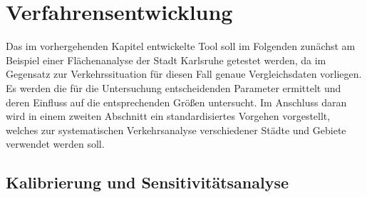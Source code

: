 \section{Verfahrensentwicklung}
\label{sec:verfahrensentwicklung}

Das im vorhergehenden Kapitel entwickelte Tool soll im Folgenden zunächst am Beispiel einer Flächenanalyse der Stadt Karlsruhe getestet werden, da im Gegensatz zur Verkehrssituation für diesen Fall genaue Vergleichsdaten vorliegen. Es werden die für die Untersuchung entscheidenden Parameter ermittelt und deren Einfluss auf die entsprechenden Größen untersucht. Im Anschluss daran wird in einem zweiten Abschnitt ein standardisiertes Vorgehen vorgestellt, welches zur systematischen Verkehrsanalyse verschiedener Städte und Gebiete verwendet werden soll.

\subsection{Kalibrierung und Sensitivitätsanalyse}

